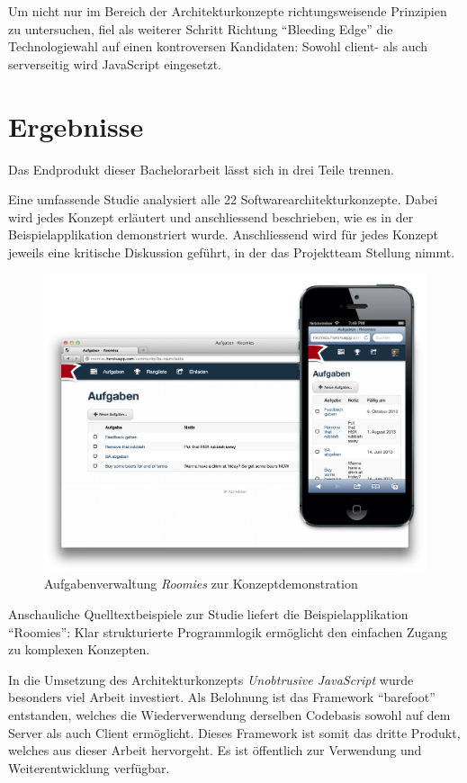 Um nicht nur im Bereich der Architekturkonzepte richtungsweisende Prinzipien zu untersuchen, fiel als weiterer Schritt Richtung ``Bleeding Edge'' die Technologiewahl auf einen kontroversen Kandidaten: Sowohl client- als auch serverseitig wird JavaScript eingesetzt.


\section{Ergebnisse}

Das Endprodukt dieser Bachelorarbeit lässt sich in drei Teile trennen.

Eine umfassende Studie analysiert alle 22 Softwarearchitekturkonzepte. Dabei wird jedes Konzept erläutert und anschliessend beschrieben, wie es in der Beispielapplikation demonstriert wurde. Anschliessend wird für jedes Konzept jeweils eine kritische Diskussion geführt, in der das Projektteam Stellung nimmt.

\begin{figure}[H]
	\centering
	\includegraphics[width=12cm]{content/principle-demonstration/images/responsive-screenshots.png}
	\caption{Aufgabenverwaltung \emph{Roomies} zur Konzeptdemonstration}
\end{figure}

Anschauliche Quelltextbeispiele zur Studie liefert die Beispielapplikation ``Roomies'': Klar strukturierte Programmlogik ermöglicht den einfachen Zugang zu komplexen Konzepten.

In die Umsetzung des Architekturkonzepts \emph{Unobtrusive JavaScript} wurde besonders viel Arbeit investiert. Als Belohnung ist das Framework ``barefoot'' entstanden, welches die Wiederverwendung derselben Codebasis sowohl auf dem Server als auch Client ermöglicht. Dieses Framework ist somit das dritte Produkt, welches aus dieser Arbeit hervorgeht. Es ist öffentlich zur Verwendung und Weiterentwicklung verfügbar.


